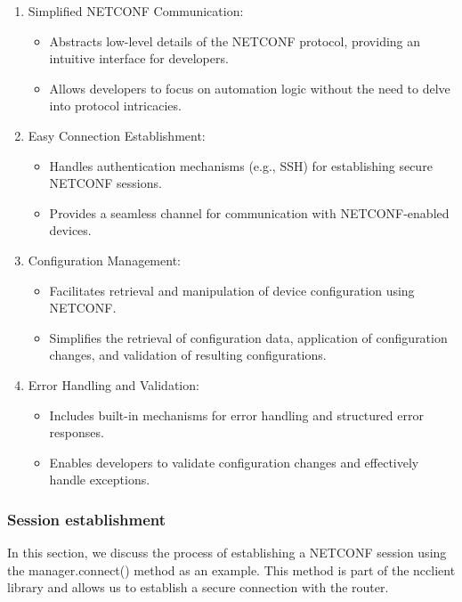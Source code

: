 \begin{enumerate}
    \item Simplified NETCONF Communication:
    \begin{itemize}
      \item Abstracts low-level details of the NETCONF protocol, providing an intuitive interface for developers.
      \item Allows developers to focus on automation logic without the need to delve into protocol intricacies.
    \end{itemize}
    
    \item Easy Connection Establishment:
    \begin{itemize}
      \item Handles authentication mechanisms (e.g., SSH) for establishing secure NETCONF sessions.
      \item Provides a seamless channel for communication with NETCONF-enabled devices.
    \end{itemize}
    
    \item Configuration Management:
    \begin{itemize}
      \item Facilitates retrieval and manipulation of device configuration using NETCONF.
      \item Simplifies the retrieval of configuration data, application of configuration changes, and validation of resulting configurations.
    \end{itemize}
    
    \item Error Handling and Validation:
    \begin{itemize}
      \item Includes built-in mechanisms for error handling and structured error responses.
      \item Enables developers to validate configuration changes and effectively handle exceptions.
    \end{itemize}

\end{enumerate}
\subsubsection{Session establishment}

In this section, we discuss the process of establishing a NETCONF session using the manager.connect() method as an example. This method is part of the ncclient library and allows us to establish a secure connection with the router.

